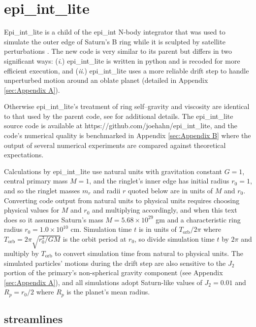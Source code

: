 \documentclass[preprint]{aastex62}
\begin{document}
\section{epi\_int\_lite}
\label{sec:epi_int_lite}

Epi\_int\_lite is a child of the epi\_int N-body integrator that was used to
simulate the outer edge of Saturn's B ring while it is sculpted by satellite perturbations
\citep{HS13}. The new code is very similar to its parent but differs in two significant ways:
({\it i}.) epi\_int\_lite is written in python and is recoded for more efficient execution, and
({\it ii}.) epi\_int\_lite uses a more reliable drift step to handle
unperturbed motion around an oblate planet (detailed in Appendix \ref{sec:Appendix A}).

Otherwise epi\_int\_lite's treatment of ring self--gravity and viscosity are identical
to that used by the parent code, see \cite{HS13} for additional details. The epi\_int\_lite 
source code is available at https://github.com/joehahn/epi\_int\_lite, and the
code's numerical quality is benchmarked in Appendix \ref{sec:Appendix B}
where the output of several numerical experiments are compared against theoretical expectations.

Calculations by epi\_int\_lite use natural units with gravitation constant $G=1$, 
central primary mass $M=1$, and the ringlet's inner edge has initial radius
$r_0=1$, and so the ringlet masses $m_r$ and radii $r$ quoted below are in units of $M$ and $r_0$.
Converting code output from natural units to physical units requires choosing	
physical values for $M$ and $r_0$ and multiplying accordingly, and when this text does so
it assumes Saturn's mass $M=5.68\times10^{29}$ gm and a characteristic
ring radius $r_0=1.0\times10^{10}$ cm. Simulation time $t$ is in units of $T_{\text{orb}}/2\pi$
where $T_{\text{orb}} = 2\pi\sqrt{r_0^3/GM}$ is the orbit period at $r_0$, 
so divide simulation time $t$ by $2\pi$ and multiply
by $T_{\text{orb}}$ to convert simulation time from natural to physical units.
The simulated particles' motions during the drift step are also
sensitive to the $J_2$ portion of the primary's non-spherical gravity component 
(see Appendix \ref{sec:Appendix A}), and all simulations
adopt Saturn-like values of $J_2=0.01$ and $R_p=r_0/2$ where $R_p$ is the planet's
mean radius.

\subsection{streamlines}
\label{subsec:streamlines}
\end{document}
